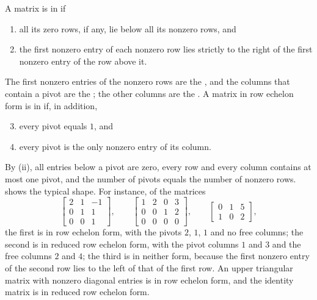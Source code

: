 \begin{definition}
\label{def:echelon}
A matrix is in  if
\begin{enumerate}
\item all its zero rows, if any, lie below all its nonzero rows, and
\item the first nonzero entry of each nonzero row lies strictly to the right of the first nonzero entry of the row above it.
\end{enumerate}
The first nonzero entries of the nonzero rows are the , and the columns that contain a pivot are the ; the other columns are the . A matrix in row echelon form is in  if, in addition,
\begin{enumerate}
\setcounter{enumi}{2}
\item every pivot equals $1$, and
\item every pivot is the only nonzero entry of its column.
\end{enumerate}
\end{definition}

By (ii), all entries below a pivot are zero, every row and every column contains at most one pivot, and the number of pivots equals the number of nonzero rows.  shows the typical shape. For instance, of the matrices
\[
\begin{bmatrix}2&1&-1\\0&1&1\\0&0&1\end{bmatrix},\qquad
\begin{bmatrix}1&2&0&3\\0&0&1&2\\0&0&0&0\end{bmatrix},\qquad
\begin{bmatrix}0&1&5\\1&0&2\end{bmatrix},
\]
the first is in row echelon form, with the pivots $2$, $1$, $1$ and no free columns; the second is in reduced row echelon form, with the pivot columns $1$ and $3$ and the free columns $2$ and $4$; the third is in neither form, because the first nonzero entry of the second row lies to the left of that of the first row. An upper triangular matrix with nonzero diagonal entries is in row echelon form, and the identity matrix is in reduced row echelon form.

